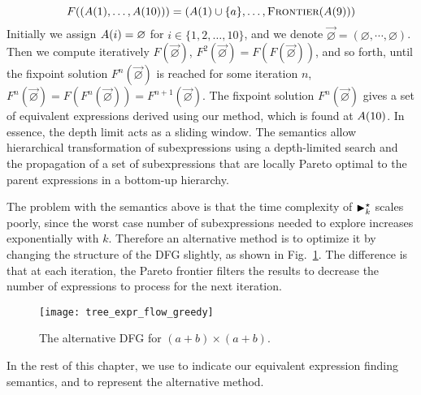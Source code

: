 \begin{equation}
      F((A({1}), \ldots, A({10})))
    = (A({1}) \cup \{a\}, \ldots, \operatorname{\textsc{Frontier}}(A({9})))
    \label{eq:transfer_function}
\end{equation}
Initially we assign $A({i}) = \varnothing$ for $i\in\{1,2,\ldots,10\}$,
and we denote $\vec\varnothing = (\varnothing, \cdots, \varnothing)$.
Then we compute iteratively $F(\vec\varnothing)$, $F^2(\vec\varnothing)
= F(F(\vec\varnothing))$, and so forth, until the fixpoint
solution $F^n(\vec\varnothing)$ is reached for some iteration
$n$, \ie~$F^n(\vec\varnothing) = F(F^n(\vec\varnothing)) = F^{n +
1}(\vec\varnothing)$. The fixpoint solution $F^n(\vec\varnothing)$ gives
a set of equivalent expressions derived using our method, which is found
at $A({10})$. In essence, the depth limit acts as a sliding window.
The semantics allow hierarchical transformation of subexpressions using a
depth-limited search and the propagation of a set of subexpressions that are
locally Pareto optimal to the parent expressions in a bottom-up hierarchy.

The problem with the semantics above is that the time complexity of
$\operatorname{\blacktriangleright}^\star_k$ scales poorly, since the worst case number of subexpressions
needed to explore increases exponentially with $k$. Therefore an alternative
method is to optimize it by changing the structure of the DFG slightly, as
shown in Fig.~\ref{fig:tree_expr_flow_greedy}. The difference is that at each
iteration, the Pareto frontier filters the results to decrease the number of
expressions to process for the next iteration.
\begin{figure}[ht]
    \centering
    \texttt{[image: tree\_expr\_flow\_greedy]}
    \caption{The alternative DFG for $(a + b) \times (a + b)$.
    }\label{fig:tree_expr_flow_greedy}
\end{figure}

In the rest of this chapter, we use \frontiertrace{} to indicate our equivalent
expression finding semantics, and \greedytrace{} to represent the alternative
method.

